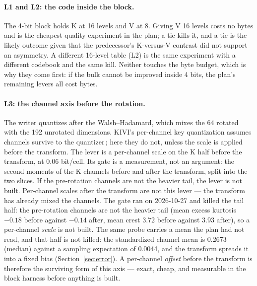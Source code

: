 \documentclass[10pt,twocolumn]{article}
\begin{document}
\paragraph{L1 and L2: the code inside the block.} The 4-bit block holds K at 16 levels and V at 8. Giving V 16 levels costs no bytes and is the cheapest quality experiment in the plan; a tie kills it, and a tie is the likely outcome given that the predecessor's K-versus-V contrast did not support an asymmetry. A different 16-level table (L2) is the same experiment with a different codebook and the same kill. Neither touches the byte budget, which is why they come first: if the bulk cannot be improved inside 4 bits, the plan's remaining levers all cost bytes.

\paragraph{L3: the channel axis before the rotation.} The writer quantizes after the Walsh--Hadamard, which mixes the 64 rotated with the 192 unrotated dimensions. KIVI's per-channel key quantization assumes channels survive to the quantizer\,\cite{kivi}; here they do not, unless the scale is applied before the transform. The lever is a per-channel scale on the K half before the transform, at 0.06 bit/cell. Its gate is a measurement, not an argument: the second moments of the K channels before and after the transform, split into the two slices. If the pre-rotation channels are not the heavier tail, the lever is not built. Per-channel scales after the transform are not this lever --- the transform has already mixed the channels. The gate ran on 2026-10-27 and killed the tail half: the pre-rotation channels are not the heavier tail (mean excess kurtosis $-0.18$ before against $-0.14$ after, mean crest 3.72 before against 3.93 after), so a per-channel \emph{scale} is not built. The same probe carries a mean the plan had not read, and that half is not killed: the standardized channel mean is 0.2673 (median) against a sampling expectation of 0.0044, and the transform spreads it into a fixed bias (Section~\ref{sec:error}). A per-channel \emph{offset} before the transform is therefore the surviving form of this axis --- exact, cheap, and measurable in the block harness before anything is built.
\end{document}
